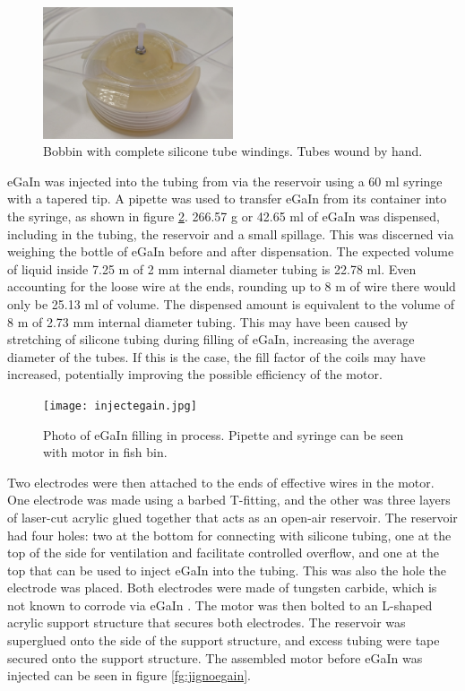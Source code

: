 \documentclass[a4paper,12pt]{article}
\begin{document}
\begin{figure}[h!]
    \centering
    \includegraphics[width=0.5\textwidth]{assembledbobbin.jpg}
    \caption{Bobbin with complete silicone tube windings. Tubes wound by hand.}
    \label{fg:assembledbobbin}
\end{figure}

eGaIn was injected into the tubing from via the reservoir using a 60 ml syringe with a tapered tip. A pipette was used to transfer eGaIn from its container into the syringe, as shown in figure \ref{fg:injectsyringe}. 266.57 g or 42.65 ml of eGaIn was dispensed, including in the tubing, the reservoir and a small spillage. This was discerned via weighing the bottle of eGaIn before and after dispensation. The expected volume of liquid inside 7.25 m of 2 mm internal diameter tubing is 22.78 ml. Even accounting for the loose wire at the ends, rounding up to 8 m of wire there would only be 25.13 ml of volume. The dispensed amount is equivalent to the volume of 8 m of 2.73 mm internal diameter tubing. This may have been caused by stretching of silicone tubing during filling of eGaIn, increasing the average diameter of the tubes. If this is the case, the fill factor of the coils may have increased, potentially improving the possible efficiency of the motor.

\begin{figure}[h!]
    \centering
    \texttt{[image: injectegain.jpg]}
    \caption{Photo of eGaIn filling in process. Pipette and syringe can be seen with motor in fish bin.}
    \label{fg:injectsyringe}
\end{figure}

Two electrodes were then attached to the ends of effective wires in the motor. One electrode was made using a barbed T-fitting, and the other was three layers of laser-cut acrylic glued together that acts as an open-air reservoir. The reservoir had four holes: two at the bottom for connecting with silicone tubing, one at the top of the side for ventilation and facilitate controlled overflow, and one at the top that can be used to inject eGaIn into the tubing. This was also the hole the electrode was placed. Both electrodes were made of tungsten carbide, which is not known to corrode via eGaIn \cite{indiumcorporationPRODUCTDATASHEET2019}. The motor was then bolted to an L-shaped acrylic support structure that secures both electrodes. The reservoir was superglued onto the side of the support structure, and excess tubing were tape secured onto the support structure. The assembled motor before eGaIn was injected can be seen in figure \ref{fg:jignoegain}.
\end{document}
